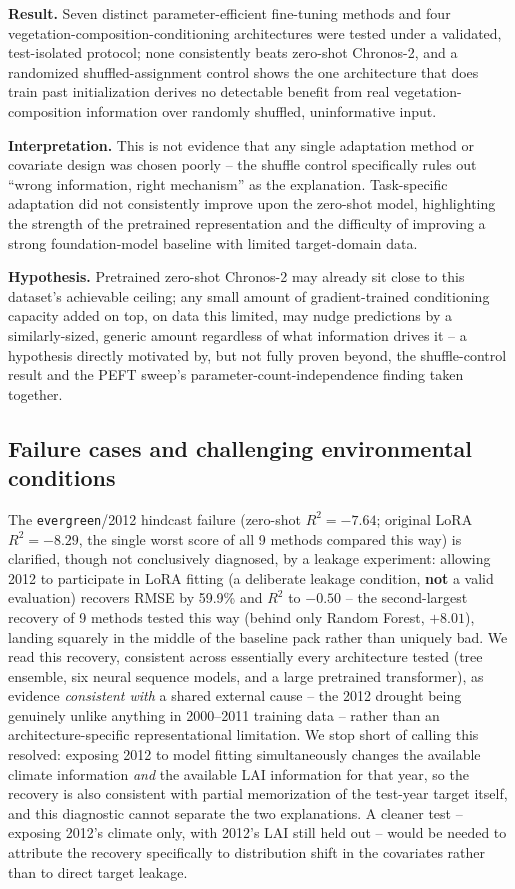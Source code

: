 \documentclass[11pt]{article}
\newcommand{\Result}[1]{\par\smallskip\noindent\textbf{Result.} #1\par}
\newcommand{\Interpretation}[1]{\noindent\textbf{Interpretation.} #1\par}
\newcommand{\Hypothesis}[1]{\noindent\textbf{Hypothesis.} #1\par\smallskip}
\begin{document}
\Result{Seven distinct parameter-efficient fine-tuning methods and four
vegetation-composition-conditioning architectures were tested under a validated, test-isolated
protocol; none consistently beats zero-shot Chronos-2, and a randomized shuffled-assignment
control shows the one architecture that does train past initialization derives no detectable
benefit from real vegetation-composition information over randomly shuffled, uninformative input.}
\Interpretation{This is not evidence that any single adaptation method or covariate design was
chosen poorly -- the shuffle control specifically rules out ``wrong information, right mechanism''
as the explanation. Task-specific adaptation did not consistently improve upon the zero-shot
model, highlighting the strength of the pretrained representation and the difficulty of improving
a strong foundation-model baseline with limited target-domain data.}
\Hypothesis{Pretrained zero-shot Chronos-2 may already sit close to this dataset's achievable
ceiling; any small amount of gradient-trained conditioning capacity added on top, on data this
limited, may nudge predictions by a similarly-sized, generic amount regardless of what
information drives it -- a hypothesis directly motivated by, but not fully proven beyond, the
shuffle-control result and the PEFT sweep's parameter-count-independence finding taken together.}



\subsection{Failure cases and challenging environmental conditions}
\label{sec:results-failure}

The \texttt{evergreen}/2012 hindcast failure (zero-shot $R^2 = -7.64$; original LoRA
$R^2 = -8.29$, the single worst score of all 9 methods compared this way) is clarified, though not
conclusively diagnosed, by a leakage experiment: allowing 2012 to participate in LoRA fitting (a
deliberate leakage condition, \textbf{not} a valid evaluation) recovers RMSE by 59.9\% and $R^2$ to
$-0.50$ -- the second-largest recovery of 9 methods tested this way (behind only Random Forest,
$+8.01$), landing squarely in the middle of the baseline pack rather than uniquely bad. We read
this recovery, consistent across essentially every architecture tested (tree ensemble, six neural
sequence models, and a large pretrained transformer), as evidence \emph{consistent with} a shared
external cause -- the 2012 drought being genuinely unlike anything in 2000--2011 training data --
rather than an architecture-specific representational limitation. We stop short of calling this
resolved: exposing 2012 to model fitting simultaneously changes the available climate information
\emph{and} the available LAI information for that year, so the recovery is also consistent with
partial memorization of the test-year target itself, and this diagnostic cannot separate the two
explanations. A cleaner test -- exposing 2012's climate only, with 2012's LAI still held out --
would be needed to attribute the recovery specifically to distribution shift in the covariates
rather than to direct target leakage.
\end{document}
